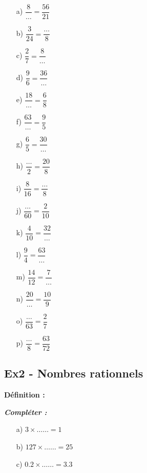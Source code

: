 \documentclass[11pt]{article}
\begin{document}
\begin{multicols}{4}

  \begin{enumerate}
    \item[a)] $\dfrac{8}{\ldots}=\dfrac{56}{21}$
    \item[b)] $\dfrac{3}{24}=\dfrac{\ldots}{8}$
    \item[c)] $\dfrac{2}{7}=\dfrac{8}{\ldots}$
    \item[d)] $\dfrac{9}{6}=\dfrac{36}{\ldots}$
    \item[e)] $\dfrac{18}{\ldots}=\dfrac{6}{8}$
    \item[f)] $\dfrac{63}{\ldots}=\dfrac{9}{5}$
    \item[g)] $\dfrac{6}{5}=\dfrac{30}{\ldots}$
    \item[h)] $\dfrac{\ldots}{2}=\dfrac{20}{8}$
    \item[i)] $\dfrac{8}{16}=\dfrac{\ldots}{8}$
    \item[j)] $\dfrac{\ldots}{60}=\dfrac{2}{10}$
    \item[k)] $\dfrac{4}{10}=\dfrac{32}{\ldots}$
    \item[l)] $\dfrac{9}{4}=\dfrac{63}{\ldots}$
    \item[m)] $\dfrac{14}{12}=\dfrac{7}{\ldots}$
    \item[n)] $\dfrac{20}{\ldots}=\dfrac{10}{9}$
    \item[o)] $\dfrac{\ldots}{63}=\dfrac{2}{7}$
    \item[p)] $\dfrac{\ldots}{8}=\dfrac{63}{72}$
  \end{enumerate}

\end{multicols}

\subsection*{Ex2 - Nombres rationnels}

\textbf{Définition :} \dotfill

\textit{\textbf{Compléter :}}

\begin{multicols}{3}

  \begin{enumerate}
  \item[a)] $ 3 \times \ldots \ldots = 1$
  \item[b)] $ 127 \times \ldots \ldots = 25$
  \item[c)] $ 0.2 \times \ldots \ldots = 3.3$
  \end{enumerate}

\end{multicols}
\end{document}
